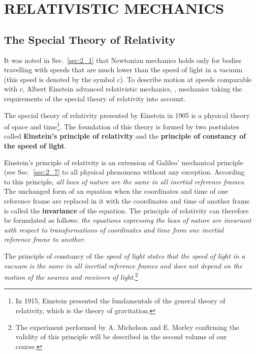 

\chapter{RELATIVISTIC MECHANICS}\label{chap:8}

\section{The Special Theory of Relativity}\label{sec:8_1}

It was noted in Sec.~\ref{sec:2_1} that Newtonian mechanics holds only for bodies travelling with speeds that are much lower than the speed of light in a vacuum (this speed is denoted by the symbol $c$). To describe motion at speeds comparable with $c$, Albert Einstein advanced relativistic mechanics, \ie, mechanics taking the requirements of the special theory of relativity into account.

The special theory of relativity presented by Einstein in 1905 is a physical theory of space and time\footnote{In 1915, Einstein presented the fundamentals of the general theory of relativity, which is the theory of gravitation.}. The foundation of this theory is formed by two postulates called \textbf{Einstein's principle of relativity} and the \textbf{principle of constancy of the speed of light}.

Einstein's principle of relativity is an extension of Galileo' mechanical principle (see Sec.~\ref{sec:2_7} to all physical phenomena without any exception. According to this principle, \textit{all laws of nature are the same in all inertial reference frames}. The unchanged form of an equation when the coordinates and time of one reference frame are replaced in it with the coordinates and time of another frame is called the \textbf{invariance} of the equation. The principle of relativity can therefore be formulated as follows: \textit{the equations expressing the laws of nature are invariant with respect to transformations of coordinates and time from one inertial reference frame to another}.

The principle of constancy of the \textit{speed of light states that the speed of light in a vacuum is the same in all inertial reference frames and does not depend on the motion of the sources and receivers of light}.\footnote{The experiment performed by A. Michelson and E. Morley confirming the validity of this principle will be described in the second volume of our course.}

